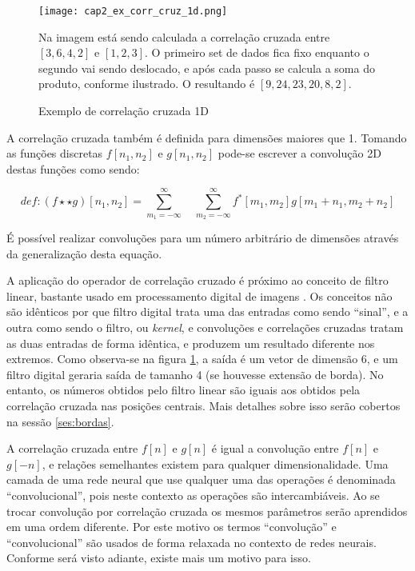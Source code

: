 \begin{figure}[!htb]
	\centering
	\texttt{[image: cap2\_ex\_corr\_cruz\_1d.png]}
	\caption{Exemplo de correlação cruzada 1D}
	\label{fig:cap2_ex_corr_cruz_1d}
	Na imagem está sendo calculada a correlação cruzada entre $[3,6,4,2]$ e
	$[1,2,3]$. O primeiro set de dados fica fixo enquanto o segundo vai sendo
	deslocado, e após cada passo se calcula a soma do produto, conforme
	ilustrado. O resultando é $[9,24,23,20,8,2]$.
\end{figure}

A correlação cruzada também é definida para dimensões maiores que 1.
Tomando as funções discretas $f[n_1,n_2]$ e $g[n_1,n_2]$ pode-se 
escrever a convolução 2D destas funções como sendo:

\begin{equation}
	def: (f \star\star g)[n_1,n_2] =
		\sum_{m_1=-\infty}^{\infty} \quad
		\sum_{m_2=-\infty}^{\infty}
		f^*[m_1,m_2]g[m_1+n_1,m_2+n_2]
\end{equation}

É possível realizar convoluções para um número arbitrário de dimensões através
da generalização desta equação.

A aplicação do operador de correlação cruzado é próximo ao conceito de filtro
linear, bastante usado em processamento digital de imagens
\cite{gonzalezwoods200708}. Os conceitos não
são idênticos por que filtro digital trata uma das entradas como sendo
``sinal'',
e a outra como sendo o filtro, ou \emph{kernel}, e convoluções e correlações
cruzadas tratam as duas entradas de forma idêntica, e produzem um resultado
diferente nos extremos. Como observa-se na figura
\ref{fig:cap2_ex_corr_cruz_1d}, a saída é um vetor de dimensão 6, e um filtro
digital geraria saída de tamanho 4 (se houvesse extensão de borda).
No entanto, os números obtidos pelo filtro linear são iguais aos obtidos pela
correlação cruzada nas posições centrais. Mais detalhes sobre isso
serão cobertos na sessão \ref{ses:bordas}.

A correlação cruzada entre $f[n]$ e $g[n]$
é igual a convolução entre $f[n]$ e $g[-n]$, e relações semelhantes existem
para qualquer dimensionalidade. Uma camada de uma rede
neural que use qualquer uma das operações é denominada “convolucional”,
pois neste contexto as operações são intercambiáveis. Ao se trocar convolução
por correlação
cruzada os mesmos parâmetros serão aprendidos em uma ordem diferente.
Por este motivo os termos ``convolução'' e ``convolucional'' são usados de forma
relaxada no contexto de redes neurais. Conforme será visto adiante, existe
mais um motivo para isso.

